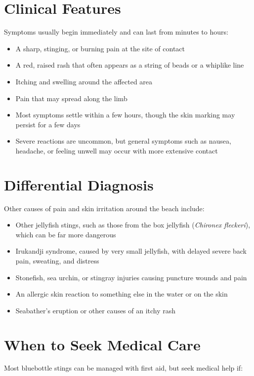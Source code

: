 \section*{Clinical Features}
Symptoms usually begin immediately and can last from minutes to hours:

\begin{itemize}
    \item A sharp, stinging, or burning pain at the site of contact
    \item A red, raised rash that often appears as a string of beads or a whiplike line
    \item Itching and swelling around the affected area
    \item Pain that may spread along the limb
    \item Most symptoms settle within a few hours, though the skin marking may persist for a few days
    \item Severe reactions are uncommon, but general symptoms such as nausea, headache, or feeling unwell may occur with more extensive contact
\end{itemize}

\section*{Differential Diagnosis}
Other causes of pain and skin irritation around the beach include:

\begin{itemize}
    \item Other jellyfish stings, such as those from the box jellyfish (\textit{Chironex fleckeri}), which can be far more dangerous
    \item Irukandji syndrome, caused by very small jellyfish, with delayed severe back pain, sweating, and distress
    \item Stonefish, sea urchin, or stingray injuries causing puncture wounds and pain
    \item An allergic skin reaction to something else in the water or on the skin
    \item Seabather's eruption or other causes of an itchy rash
\end{itemize}

\section*{When to Seek Medical Care}
Most bluebottle stings can be managed with first aid, but seek medical help if:

